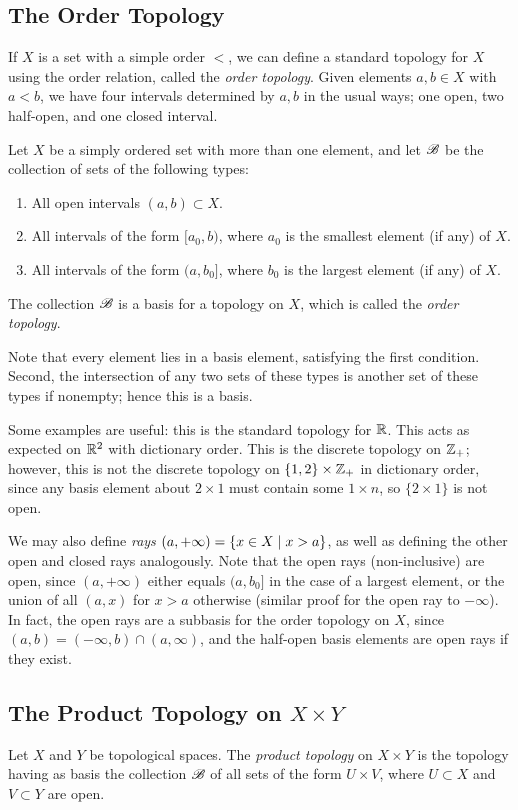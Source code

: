 \documentclass[10pt]{report}
\begin{document}
\subsection{The Order Topology}
If $X$ is a set with a simple order $<$, we can define a standard topology for $X$ using the order relation, called the \emph{order topology}.
Given elements $a,b \in X$ with $a<b$, we have four intervals determined by $a,b$ in the usual ways; one open, two half-open, and one closed interval.
\begin{definition}
  Let $X$ be a simply ordered set with more than one element, and let $\mathscr{B}$ be the collection of sets of the following types:
  \begin{enumerate}[label={(\arabic*)}]
    \item All open intervals $(a,b) \subset X$.
    \item All intervals of the form $[a_0,b)$, where $a_0$ is the smallest element (if any) of $X$.
    \item All intervals of the form $(a,b_0]$, where $b_0$ is the largest element (if any) of $X$.
  \end{enumerate}
  The collection $\mathscr{B}$ is a basis for a topology on $X$, which is called the \emph{order topology}.
\end{definition}
Note that every element lies in a basis element, satisfying the first condition.  
Second, the intersection of any two sets of these types is another set of these types if nonempty; hence this is a basis.

Some examples are useful: this is the standard topology for $\mathbb{R}$.
This acts as expected on $\mathbb{R}^2$ with dictionary order.
This is the discrete topology on $\mathbb{Z}_+$;
however, this is not the discrete topology on $\left\{ 1,2 \right\} \times \mathbb{Z}_+$ in dictionary order, since any basis element about $2 \times 1$ must contain some $1 \times n$, so $\{2 \times 1\}$ is not open.

We may also define \emph{rays} $(a,+\infty) = \left\{ x \in X \mid x > a \right\}$, as well as defining the other open and closed rays analogously.
Note that the open rays (non-inclusive) are open, since $(a,+\infty)$ either equals $(a,b_0]$ in the case of a largest element, or the union of all $(a,x)$ for $x > a$ otherwise (similar proof for the open ray to $-\infty$).
In fact, the open rays are a subbasis for the order topology on $X$, since $(a,b) = (-\infty,b) \cap (a,\infty)$, and the half-open basis elements are open rays if they exist.

\subsection{The Product Topology on \texorpdfstring{$X \times Y$}{XxY}}
\begin{definition}
  Let $X$ and $Y$ be topological spaces.
  The \emph{product topology} on $X \times Y$ is the topology having as basis the collection $\mathscr{B}$ of all sets of the form $U \times V$, where $U \subset X$ and $V \subset Y$ are open.
\end{definition}
\end{document}
